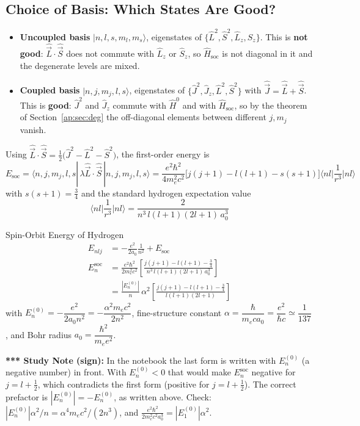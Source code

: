 \documentclass[11pt,a4paper]{article}
\begin{document}
\subsection{Choice of Basis: Which States Are Good?}
\begin{itemize}
    \item \textbf{Uncoupled basis} $|n,l,s,m_l,m_s\rangle$, eigenstates of $\{\hat L^2,\hat S^2,\hat L_z,\hat S_z\}$. This is \textbf{not good}: $\hat{\vec L}\cdot\hat{\vec S}$ does not commute with $\hat L_z$ or $\hat S_z$, so $\hat H_{\text{soc}}$ is not diagonal in it and the degenerate levels are mixed.
    \item \textbf{Coupled basis} $|n,j,m_j,l,s\rangle$, eigenstates of $\{\hat J^2,\hat J_z,\hat L^2,\hat S^2\}$ with $\hat{\vec J} = \hat{\vec L}+\hat{\vec S}$. This is \textbf{good}: $\hat J^2$ and $\hat J_z$ commute with $\hat H^0$ and with $\hat H_{\text{soc}}$, so by the theorem of Section~\ref{ap:sec:deg} the off-diagonal elements between different $j,m_j$ vanish.
\end{itemize}
Using $\hat{\vec L}\cdot\hat{\vec S} = \tfrac12\big(\hat J^2 - \hat L^2 - \hat S^2\big)$, the first-order energy is
\[
E_{\text{soc}} = \langle n,j,m_j,l,s|\,\lambda\hat{\vec L}\cdot\hat{\vec S}\,|n,j,m_j,l,s\rangle
= \frac{e^2\hbar^2}{4m_e^2c^2}\Big[j(j+1) - l(l+1) - s(s+1)\Big]\Big\langle n l\Big|\frac1{r^3}\Big|n l\Big\rangle
\]
with $s(s+1)=\tfrac34$ and the standard hydrogen expectation value
\[
\Big\langle n l\Big|\frac{1}{r^3}\Big|n l\Big\rangle = \frac{2}{n^3\,l(l+1)(2l+1)\,a_0^3}
\]
\begin{thm}{Spin-Orbit Energy of Hydrogen}
\begin{align*}
E_{nlj} &= -\frac{e^2}{2a_0}\frac1{n^2} + E_{\text{soc}}\\
E^{\text{soc}}_n &= \frac{e^2\hbar^2}{2m_e^2c^2}\left[\frac{j(j+1)-l(l+1)-\tfrac34}{n^3\,l(l+1)(2l+1)\,a_0^3}\right]\\
&= \frac{|E_n^{(0)}|}{n}\,\alpha^2\left[\frac{j(j+1)-l(l+1)-\tfrac34}{l(l+1)(2l+1)}\right]
\end{align*}
with $E_n^{(0)} = -\dfrac{e^2}{2a_0n^2} = -\dfrac{\alpha^2m_ec^2}{2n^2}$, fine-structure constant $\alpha = \dfrac{\hbar}{m_eca_0} = \dfrac{e^2}{\hbar c}\simeq\dfrac1{137}$, and Bohr radius $a_0 = \dfrac{\hbar^2}{m_ee^2}$.
\end{thm}
\textbf{*** Study Note (sign):} In the notebook the last form is written with $E_n^{(0)}$ (a negative number) in front. With $E_n^{(0)}<0$ that would make $E_n^{\text{soc}}$ negative for $j=l+\tfrac12$, which contradicts the first form (positive for $j=l+\frac12$). The correct prefactor is $|E_n^{(0)}| = -E_n^{(0)}$, as written above. Check: $|E_n^{(0)}|\alpha^2/n = \alpha^4m_ec^2/(2n^3)$, and $\frac{e^2\hbar^2}{2m_e^2c^2a_0^3} = |E_1^{(0)}|\alpha^2$. \checkmark
\end{document}
